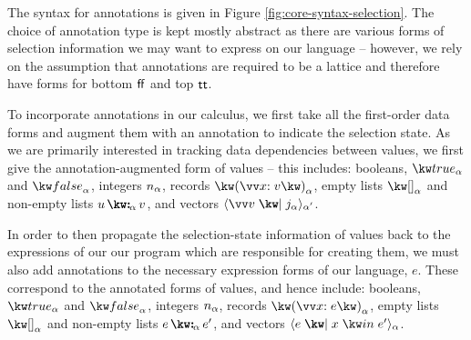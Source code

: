 

\noindent
The syntax for annotations is given in Figure \ref{fig:core-syntax-selection}. The choice of annotation type is kept mostly abstract as there are various forms of selection information we may want to express on our language -- however, we rely on the assumption that annotations are required to be a lattice and therefore have forms for bottom $\mathsf{ff}$ and top $\mathsf{tt}$. 

To incorporate annotations in our calculus, we first take all the first-order data forms and augment them with an annotation to indicate the selection state. As we are primarily interested in tracking data dependencies between values, we first give the annotation-augmented form of values -- this includes: booleans, $\annTrue{\alpha}$ and $\annFalse{\alpha}$, integers $n_{\alpha}$, records $\annRec{\vec{\bind{x}{v}}}{\alpha}$, empty lists $\annNil{\alpha}$ and non-empty lists $\annCons{u}{v}{\alpha}$, and vectors $\annVecVal{\vec{v}}{\annInt{j}{\alpha}}{\smash{\alpha'}}$.

In order to then propagate the selection-state information of values back to the expressions of our our program which are responsible for creating them, we must also add annotations to the necessary expression forms of our language, $e$. These correspond to the annotated forms of values, and hence include: booleans, $\annTrue{\alpha}$ and $\annFalse{\alpha}$, integers $n_{\alpha}$, records $\annRec{\vec{\bind{x}{e}}}{\alpha}$, empty lists $\annNil{\alpha}$ and non-empty lists $\annCons{e}{e'}{\alpha}$, and vectors $\annVec{e}{x}{e'}{\alpha}$.


